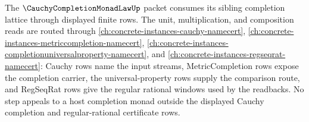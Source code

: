 The $\CauchyCompletionMonadLawUp$ packet consumes its sibling completion lattice through displayed finite rows. The unit, multiplication, and composition reads are routed through \autoref{ch:concrete-instances-cauchy-namecert}, \autoref{ch:concrete-instances-metriccompletion-namecert}, \autoref{ch:concrete-instances-completionuniversalproperty-namecert}, and \autoref{ch:concrete-instances-regseqrat-namecert}: Cauchy rows name the input streams, MetricCompletion rows expose the completion carrier, the universal-property rows supply the comparison route, and RegSeqRat rows give the regular rational windows used by the readbacks. No step appeals to a host completion monad outside the displayed Cauchy completion and regular-rational certificate rows.
